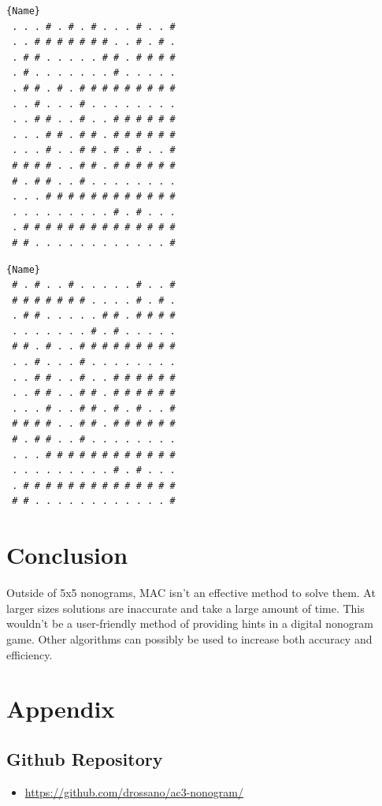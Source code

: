 \documentclass[12pt, letterpaper]
{article}
\begin{document}
\noindent\begin{minipage}{.45\textwidth}
\begin{lstlisting}[caption=True solution for a 15x15 nonogram,frame=tlrb]{Name}
 . . . # . # . # . . . # . . #
 . . # # # # # # # . . # . # .
 . # # . . . . . # # . # # # #
 . # . . . . . . . # . . . . .
 . # # . # . # # # # # # # # #
 . . # . . . # . . . . . . . .
 . . # # . . # . . # # # # # #
 . . . # # . # # . # # # # # #
 . . . # . . # # . # . # . . #
 # # # # . . # # . # # # # # #
 # . # # . . # . . . . . . . .
 . . . # # # # # # # # # # # #
 . . . . . . . . . # . # . . .
 . # # # # # # # # # # # # # #
 # # . . . . . . . . . . . . #
\end{lstlisting}
\end{minipage}\hfill
\begin{minipage}{.45\textwidth}
\begin{lstlisting}[caption= Program solution for a 15x15 nonogram,frame=tlrb]{Name}
 # . # . . # . . . . . # . . #
 # # # # # # # . . . . # . # .
 . # # . . . . . # # . # # # #
 . . . . . . . # . # . . . . .
 # # . # . . # # # # # # # # #
 . . # . . . # . . . . . . . .
 . . # # . . # . . # # # # # #
 . . # # . . # # . # # # # # #
 . . . # . . # # . # . # . . #
 # # # # . . # # . # # # # # #
 # . # # . . # . . . . . . . .
 . . . # # # # # # # # # # # #
 . . . . . . . . . # . # . . .
 . # # # # # # # # # # # # # #
 # # . . . . . . . . . . . . #
\end{lstlisting}
\end{minipage}


\section{Conclusion}
Outside of 5x5 nonograms, MAC isn't an effective method to solve them. At larger sizes solutions are inaccurate and take a large amount of time. This wouldn't be a user-friendly method of providing hints in a digital nonogram game. Other algorithms can possibly be used to increase both accuracy and efficiency.

\pagebreak
\appendix
\section{Appendix}
\subsection{Github Repository}
\begin{itemize}
 \item \href{https://github.com/drossano/ac3-nonogram/}{https://github.com/drossano/ac3-nonogram/}
\end{itemize}
\end{document}
